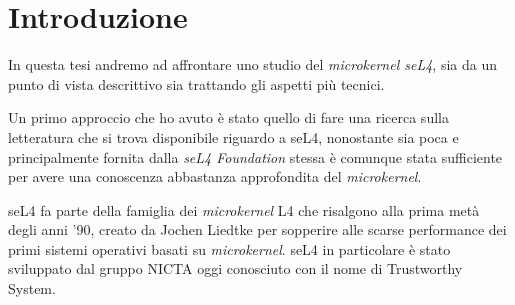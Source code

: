 \chapter{Introduzione}
In questa tesi andremo ad affrontare uno studio del \textit{microkernel seL4}, sia da un punto di vista descrittivo sia trattando gli aspetti più tecnici.

Un primo approccio che ho avuto è stato quello di fare una ricerca sulla letteratura che si trova disponibile riguardo a seL4, nonostante sia poca e principalmente fornita dalla \textit{seL4 Foundation} stessa è comunque stata sufficiente per avere una conoscenza abbastanza approfondita del \textit{microkernel}. 


seL4 fa parte della famiglia dei \textit{microkernel} L4 che risalgono alla prima metà degli anni '90, creato da Jochen Liedtke per sopperire alle scarse performance dei primi sistemi operativi basati su \textit{microkernel}. seL4 in particolare è stato sviluppato dal gruppo NICTA oggi conosciuto con il nome di Trustworthy System.

